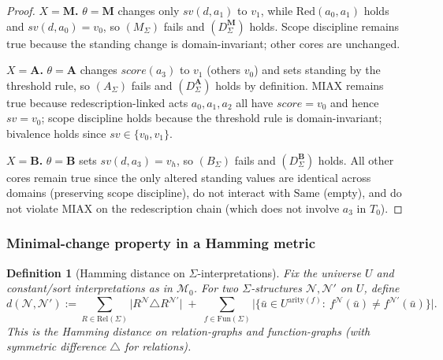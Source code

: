 \documentclass[12pt]{article}
\newtheorem{definition}{Definition}
\begin{document}
\begin{proof}
\textbf{$X=\mathbf{M}$.} $\theta=\mathbf{M}$ changes only $sv(d,a_1)$ to $v_1$, while $\mathrm{Red}(a_0,a_1)$ holds and $sv(d,a_0)=v_0$, so $(M_\Sigma)$ fails and $(D^{\mathbf{M}}_\Sigma)$ holds. Scope discipline remains true because the standing change is domain-invariant; other cores are unchanged.

\textbf{$X=\mathbf{A}$.} $\theta=\mathbf{A}$ changes $score(a_3)$ to $v_1$ (others $v_0$) and sets standing by the threshold rule, so $(A_\Sigma)$ fails and $(D^{\mathbf{A}}_\Sigma)$ holds by definition. MIAX remains true because redescription-linked acts $a_0,a_1,a_2$ all have $score=v_0$ and hence $sv=v_0$; scope discipline holds because the threshold rule is domain-invariant; bivalence holds since $sv\in\{v_0,v_1\}$.

\textbf{$X=\mathbf{B}$.} $\theta=\mathbf{B}$ sets $sv(d,a_3)=v_h$, so $(B_\Sigma)$ fails and $(D^{\mathbf{B}}_\Sigma)$ holds. All other cores remain true since the only altered standing values are identical across domains (preserving scope discipline), do not interact with $\mathrm{Same}$ (empty), and do not violate MIAX on the redescription chain (which does not involve $a_3$ in $T_0$).
\end{proof}


\subsubsection{Minimal-change property in a Hamming metric}
\label{app:minchange}

\begin{definition}[Hamming distance on $\Sigma$-interpretations]
Fix the universe $U$ and constant/sort interpretations as in $\mathcal{M}_0$.
For two $\Sigma$-structures $\mathcal{N},\mathcal{N}'$ on $U$, define
\[
d(\mathcal{N},\mathcal{N}'):=\sum_{R\in\mathrm{Rel}(\Sigma)} \big|R^{\mathcal{N}}\triangle R^{\mathcal{N}'}\big|
\;+\;
\sum_{f\in\mathrm{Fun}(\Sigma)} \big|\{\bar u\in U^{\mathrm{arity}(f)}:\ f^{\mathcal{N}}(\bar u)\neq f^{\mathcal{N}'}(\bar u)\}\big|.
\]
This is the Hamming distance on relation-graphs and function-graphs (with symmetric difference $\triangle$ for relations).
\end{definition}
\end{document}
